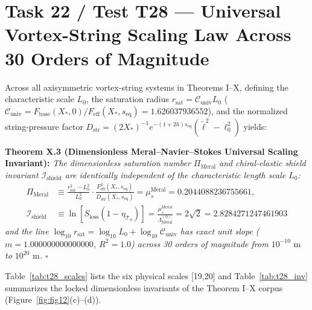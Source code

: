 \documentclass[12pt,a4paper]{article}
\begin{document}
\section{Task 22 / Test T28 --- Universal Vortex-String Scaling Law Across 30 Orders of Magnitude}

Across all axisymmetric vortex-string systems in Theorems I--X, defining the characteristic scale $L_0$, the saturation radius $r_{\mathrm{sat}} = \mathcal{C}_{\mathrm{univ}} L_0$ ($\mathcal{C}_{\mathrm{univ}} = F_{\mathrm{base}}(X_*,0)/F_{\mathrm{eff}}(X_*,s_{\mathrm{eq}}) = 1.626037936552$), and the normalized string-pressure factor $D_{\mathrm{str}} = (2X_*)^{-1}e^{-(1+2h)s_{\mathrm{eq}}}(\tilde{\ell}^2 - \ell_0^2)$ yields:

\textbf{Theorem X.3 (Dimensionless Meral--Navier--Stokes Universal Scaling Invariant):} \textit{The dimensionless saturation number $\Pi_{\mathrm{Meral}}$ and chiral-elastic shield invariant $\mathcal{I}_{\mathrm{shield}}$ are identically independent of the characteristic length scale $L_0$:}
\begin{equation}
\begin{split}
\Pi_{\mathrm{Meral}}
&\equiv \frac{r_{\mathrm{sat}}^2 - L_0^2}{L_0^2}\cdot\frac{F_{\mathrm{eff}}^2(X_*,s_{\mathrm{eq}})}{D_{\mathrm{str}}(X_*,s_{\mathrm{eq}})}
= \mu_s^{\mathrm{Meral}} = 0.2044088236755661, \\
\mathcal{I}_{\mathrm{shield}}
&\equiv \ln\!\left[S_{\mathrm{loss}}(1-\eta_{\mathcal{T}_0})\right]
= \frac{\mu_s^{\mathrm{Meral}}}{\Lambda_{\mathrm{Meral}}^{(0)}}
= 2\sqrt{2} = 2.8284271247461903
\end{split}
\label{eq:t28_pi}
\end{equation}
\textit{and the line $\log_{10} r_{\mathrm{sat}} = \log_{10} L_0 + \log_{10}\mathcal{C}_{\mathrm{univ}}$ has exact unit slope ($m = 1.000000000000000$, $R^2 = 1.0$) across 30 orders of magnitude from $10^{-10}\text{ m}$ to $10^{20}\text{ m}$. $\square$}

Table~\ref{tab:t28_scales} lists the six physical scales [19,20] and Table~\ref{tab:t28_inv} summarizes the locked dimensionless invariants of the Theorem I--X corpus (Figure~\ref{fig:fig12}(c)--(d)).
\end{document}
